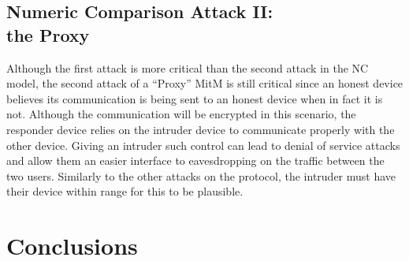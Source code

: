 \documentclass{acm_proc_article-sp}
\begin{document}
\subsection{Numeric Comparison Attack II:\\the Proxy}
Although the first attack is more critical than the second attack in the NC model, the second attack of a ``Proxy'' MitM is still critical since an honest device believes its communication is being sent to an honest device when in fact it is not. Although the communication will be encrypted in this scenario, the responder device relies on the intruder device to communicate properly with the other device. Giving an intruder such control can lead to denial of service attacks and allow them an easier interface to eavesdropping on the traffic between the two users. Similarly to the other attacks on the protocol, the intruder must have their device within range for this to be plausible. 

\section{Conclusions}







\end{document}
